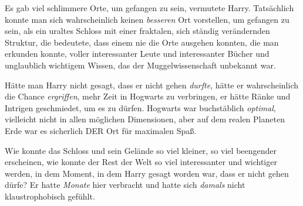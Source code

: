 Es gab viel schlimmere Orte, um gefangen zu sein, vermutete Harry. Tatsächlich konnte man sich wahrscheinlich keinen \emph{besseren} Ort vorstellen, um gefangen zu sein, als ein uraltes Schloss mit einer fraktalen, sich ständig verändernden Struktur, die bedeutete, dass einem nie die Orte ausgehen konnten, die man erkunden konnte, voller interessanter Leute und interessanter Bücher und unglaublich wichtigem Wissen, das der Muggelwissenschaft unbekannt war.

Hätte man Harry nicht gesagt, dass er nicht gehen \emph{durfte}, hätte er wahrscheinlich die Chance \emph{ergriffen}, mehr Zeit in Hogwarts zu verbringen, er hätte Ränke und Intrigen geschmiedet, um es zu dürfen. Hogwarts war buchstäblich \emph{optimal}, vielleicht nicht in allen möglichen Dimensionen, aber auf dem realen Planeten Erde war es sicherlich DER Ort für maximalen Spaß.

Wie konnte das Schloss und sein Gelände so viel kleiner, so viel beengender erscheinen, wie konnte der Rest der Welt so viel interessanter und wichtiger werden, in dem Moment, in dem Harry gesagt worden war, dass er nicht gehen dürfe? Er hatte \emph{Monate} hier verbracht und hatte sich \emph{damals} nicht klaustrophobisch gefühlt.

